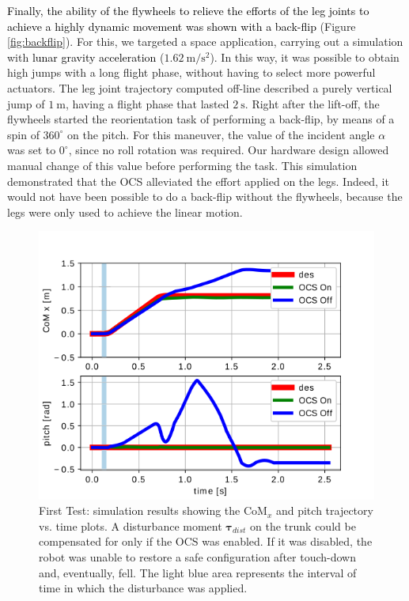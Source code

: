 \documentclass[sensors,article,accept,pdftex,moreauthors]{Definitions/mdpi}
\newcommand{\MF}[1]{\textcolor{black}{#1}}
\begin{document}
\MF{Finally, the ability of the flywheels to relieve the efforts of the leg joints to achieve a highly dynamic movement was shown with a back-flip} (Figure \ref{fig:backflip}). 
For this, we targeted a space application, carrying out a simulation with \MF{lunar gravity acceleration} ($1.62 \ \mathrm{m/s^2}$).
In this way, it was possible to obtain high jumps with a long flight phase, without having to select more powerful actuators.  
The leg joint trajectory computed off-line described a purely vertical jump of $1 \ \mathrm{m}$, having a flight phase that lasted $2 \ \mathrm{s}$.
Right after the lift-off, the flywheels started the reorientation task of performing a back-flip, by means of a spin of $360^\circ$ on the pitch.
For this maneuver, the value of the incident angle $\alpha$ was set to $0^\circ$, since no roll rotation was required.
Our hardware design allowed manual change of this value before performing the task.
This simulation demonstrated that the OCS alleviated the effort applied on the legs. Indeed, it would not have been possible to do a back-flip without the flywheels, because the legs were only used to achieve the linear motion. 
\begin{figure}[H]%
 
	\includegraphics[width=.7\linewidth]{figures/drawing.png}
	\caption{\small First Test: simulation results showing the $\mathrm{CoM}_x$ and pitch trajectory vs. time plots. A disturbance moment $\bm{\tau}_{dist}$ on the trunk could be compensated for only if the OCS was enabled. If it was disabled, the robot was unable to restore a safe configuration after touch-down and, eventually, fell. The light blue area represents the interval of time in which the disturbance was applied.}
	\label{fig:fw_jump}
\end{figure}
\end{document}

